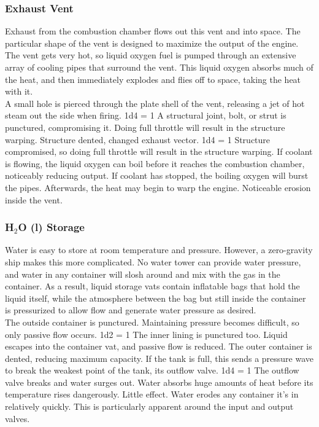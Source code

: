 \documentclass[a4paper]{article}
\begin{document}
\vspace{-0.5cm} \hspace{-18pt} \subsubsection{Exhaust Vent} \label{engine_exhaust} \vspace{-0.2cm}
Exhaust from the combustion chamber flows out this vent and into space. The particular shape of the vent is designed to maximize the output of the engine. The vent gets very hot, so liquid oxygen fuel is pumped through an extensive array of cooling pipes that surround the vent. This liquid oxygen absorbs much of the heat, and then immediately explodes and flies off to space, taking the heat with it.
\\ \pbhw
{A small hole is pierced through the plate shell of the vent, releasing a jet of hot steam out the side when firing. \newline 1d4 = 1 A structural joint, bolt, or strut is punctured, compromising it. Doing full throttle will result in the structure warping.}
{Structure dented, changed exhaust vector. \newline 1d4 = 1 Structure compromised, so doing full throttle will result in the structure warping.}
{If coolant is flowing, the liquid oxygen can boil before it reaches the combustion chamber, noticeably reducing output. If coolant has stopped, the boiling oxygen will burst the pipes. Afterwards, the heat may begin to warp the engine.}
{Noticeable erosion inside the vent.}



\vspace{-0.5cm} \hspace{-18pt} \subsubsection{H$_2$O (l) Storage} \label{engine_h2o_storage} \vspace{-0.2cm} 
Water is easy to store at room temperature and pressure. However, a zero-gravity ship makes this more complicated. No water tower can provide water pressure, and water in any container will slosh around and mix with the gas in the container. As a result, liquid storage vats contain inflatable bags that hold the liquid itself, while the atmosphere between the bag but still inside the container is pressurized to allow flow and generate water pressure as desired.
\\ \pbhw
{The outside container is punctured. Maintaining pressure becomes difficult, so only passive flow occurs. \newline 1d2 = 1 The inner lining is punctured too. Liquid escapes into the container vat, and passive flow is reduced.}
{The outer container is dented, reducing maximum capacity. If the tank is full, this sends a pressure wave to break the weakest point of the tank, its outflow valve. 1d4 = 1 The outflow valve breaks and water surges out.}
{Water absorbs huge amounts of heat before its temperature rises dangerously. Little effect.}
{Water erodes any container it's in relatively quickly. This is particularly apparent around the input and output valves.}
\end{document}
